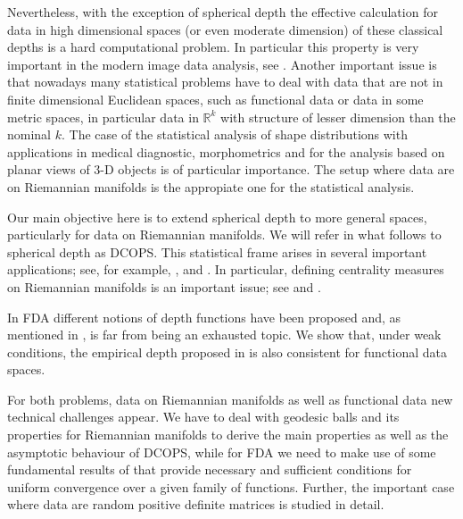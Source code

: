 \documentclass[a4paper]{article}
\numberwithin{equation}{section}
\begin{document}
Nevertheless, with the exception of spherical depth the effective calculation for data in high dimensional spaces (or even moderate dimension) of these classical depths is a hard computational problem. In particular this property is very important in the modern image data analysis, see \cite{pizer2017}.  Another important issue is that nowadays many statistical problems have to deal with data that are not in finite dimensional Euclidean spaces, such as functional data or data in some metric spaces, in particular data in $\mathbb{R}^k$ with structure of lesser dimension than
the nominal $k$.
The case of the statistical analysis of shape distributions with applications in medical diagnostic, morphometrics and for the analysis based on planar views of 3-D objects is of particular importance. The setup where data are on Riemannian manifolds is the appropiate one for the statistical analysis.


Our main objective here is to extend spherical depth  to more general spaces, particularly for data on Riemannian manifolds. We will refer in what follows to spherical depth as DCOPS. This  statistical frame arises in several important applications; see, for example,  \cite{patrangenaru2015}, \cite{bhattacharya2008} and \cite{pennec2006}. In particular, defining centrality measures on Riemannian manifolds is an important issue; see  \cite{fletcher2009} and \cite{barbaresco2013}.

In FDA different notions of depth functions have been proposed and, as mentioned in \cite{cuevas2014}, is far from being an exhausted topic.  We show that, under weak conditions, the empirical depth proposed in \cite{elmore2006} is also consistent for functional data spaces.

For both problems, data on Riemannian manifolds as well as functional data  new technical challenges appear. We have to deal with geodesic balls and its properties for Riemannian manifolds to derive the main properties as well as the asymptotic behaviour of DCOPS, while for FDA we need to make use of  some fundamental results of \cite{billingsley1967} that provide necessary and sufficient conditions for uniform convergence over a given family of functions. Further, the important case where data are random positive definite matrices is studied in  detail.

 
\end{document}
